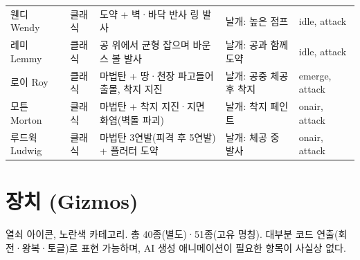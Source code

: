 \documentclass[10pt,a4paper]{article}
\begin{document}
\begin{longtable}{L{2.7cm} L{1.4cm} L{6.2cm} L{2.8cm} L{1.9cm}}
웬디 Wendy & 클래식 & 도약 + 벽·바닥 반사 링 발사 & 날개: 높은 점프 & idle, attack \\
레미 Lemmy & 클래식 & 공 위에서 균형 잡으며 바운스 볼 발사 & 날개: 공과 함께 도약 & idle, attack \\
로이 Roy & 클래식 & 마법탄 + 땅·천장 파고들어 출몰, 착지 지진 & 날개: 공중 체공 후 착지 & emerge, attack \\
모튼 Morton & 클래식 & 마법탄 + 착지 지진·지면 화염(벽돌 파괴) & 날개: 착지 페인트 & onair, attack \\
루드윅 Ludwig & 클래식 & 마법탄 3연발(피격 후 5연발) + 플러터 도약 & 날개: 체공 중 발사 & onair, attack \\
\bottomrule
\end{longtable}

\section{장치 (Gizmos)}

열쇠 아이콘, 노란색 카테고리. 총 40종(별도)·51종(고유 명칭).
대부분 코드 연출(회전·왕복·토글)로 표현 가능하며, AI 생성 애니메이션이
필요한 항목이 사실상 없다.
\end{document}
